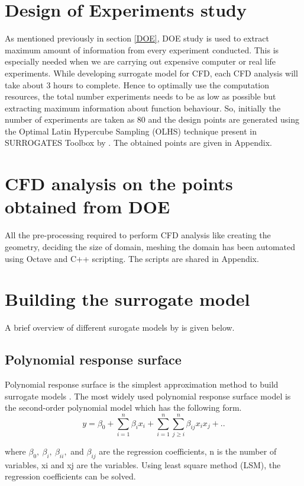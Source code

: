 \section{Design of Experiments study}

As mentioned previously in section \ref{DOE}, DOE study is used to extract maximum amount of information from every experiment conducted. This is especially needed when we are carrying out expensive computer or real life experiments. While developing surrogate model for CFD, each CFD analysis will take about 3 hours to complete. Hence to optimally use the computation resources, the total number experiments needs to be as low as possible but extracting maximum information about function behaviour. So, initially the number of experiments are taken as 80 and the design points are generated using the Optimal Latin Hypercube Sampling (OLHS) technique present in SURROGATES Toolbox by \cite{viana2014metamodeling}. The obtained points are given in Appendix.

\section{CFD analysis on the points obtained from DOE}
\label{Three surrogate models}

All the pre-processing required to perform CFD analysis like creating the geometry, deciding the size of domain, meshing the domain has been automated using Octave and C++ scripting. The scripts are shared in Appendix.
\section{Building the surrogate model}
A brief overview of different surogate models by \cite{luo2014comparison} is given below.
\subsection{Polynomial response surface}
Polynomial response surface is the simplest approximation method to build surrogate models \cite{forrester2009recent}. The most widely used polynomial response surface model is the second-order polynomial model which has the following form.
\begin{equation}
y = \beta _{0} + \sum_{i=1}^{n} \beta _{i} x_{i} + \sum_{i=1}^{n} \sum_{j \ge i}^{n} \beta _{ij} x_{i} x_{j} + ..
\end{equation}

where $ \beta _{0},\ \beta_{i},\ \beta _{ii},$ and $ \beta _{ij} $ are the regression coefficients, n is the number of variables, xi and xj are the variables. Using least square method (LSM), the regression coefficients can be solved.

